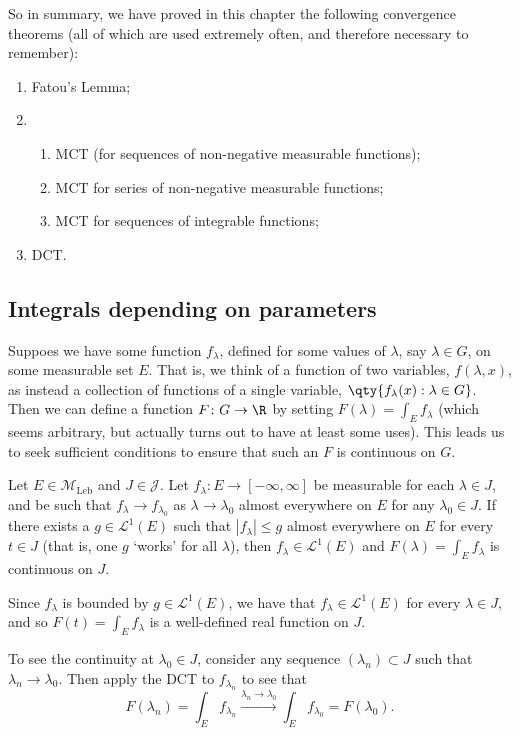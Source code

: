 \documentclass{maths}
\newcommand{\mleb}{\mathcal{M}_{\text{Leb}}}
\newcommand{\intvl}{\mathcal{J}}
\begin{document}
\begin{rem}
    So in summary, we have proved in this chapter the following convergence theorems (all of which are used extremely often, and therefore necessary to remember):
    \begin{enumerate}
        \item Fatou's Lemma;
        \item \begin{enumerate}
            \item MCT (for sequences of non-negative measurable functions);
            \item MCT for series of non-negative measurable functions;
            \item MCT for sequences of integrable functions;
        \end{enumerate}
        \item DCT.
    \end{enumerate}
\end{rem}

\subsection{Integrals depending on parameters}

Suppoes we have some function $f_\lambda$, defined for some values of $\lambda$, say $\lambda\in G$, on some measurable set $E$.
That is, we think of a function of two variables, $f(\lambda,x)$, as instead a collection of functions of a single variable, $\qty{f_\lambda(x) : \lambda\in G}$.
Then we can define a function $F\colon G\to\R$ by setting $F(\lambda)=\int_E f_\lambda$ (which seems arbitrary, but actually turns out to have at least some uses).
This leads us to seek sufficient conditions to ensure that such an $F$ is continuous on $G$.

\begin{thm}
    Let $E\in\mleb$ and $J\in\intvl$.
    Let $f_\lambda\colon E\to[-\infty,\infty]$ be measurable for each $\lambda\in J$, and be such that $f_\lambda\to f_{\lambda_0}$ as $\lambda\to \lambda_0$ almost everywhere on $E$ for any $\lambda_0\in J$.
    If there exists a $g\in \mathcal{L}^1(E)$ such that $|f_\lambda|\leqslant g$ almost everywhere on $E$ for every $t\in J$ (that is, one $g$ `works' for all $\lambda$), then $f_\lambda\in \mathcal{L}^1(E)$ and $F(\lambda)=\int_E f_\lambda$ is continuous on $J$.
\end{thm}

\begin{prf}
    Since $f_\lambda$ is bounded by $g\in \mathcal{L}^1(E)$, we have that $f_\lambda\in \mathcal{L}^1(E)$ for every $\lambda\in J$, and so $F(t)=\int_E f_\lambda$ is a well-defined real function on $J$.

    To see the continuity at $\lambda_0\in J$, consider any sequence $(\lambda_n)\subset J$ such that $\lambda_n\to\lambda_0$.
    Then apply the DCT to $f_{\lambda_n}$ to see that
    \[
        F(\lambda_n) =
        \int_E f_{\lambda_n} \overset{\lambda_n\to\lambda_0}{\longrightarrow}
        \int_E f_{\lambda_0} =
        F(\lambda_0).
    \]
\end{prf}
\end{document}

